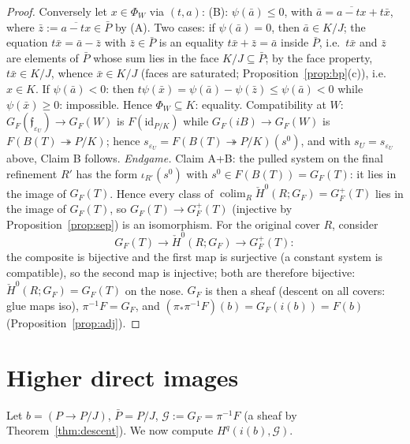 \documentclass[11pt]{article}
\theoremstyle{definition}
\newcommand{\colim}{\operatorname*{colim}}
\newcommand{\HH}{\check{H}}
\begin{document}
\begin{proof}
Conversely let $x\in\Phi_W$ via $(t,a)$: (B): $\psi(\bar a)\le0$,
with $\bar a=\overline{a-tx}+t\bar x$, where
$\bar z:=\overline{a-tx}\in\bar P$ by (A). Two cases: if
$\psi(\bar a)=0$, then $\bar a\in K/J$; the equation
$t\bar x=\bar a-\bar z$ with $\bar z\in\bar P$ is an equality
$t\bar x+\bar z=\bar a$ inside $\bar P$, i.e.\ $t\bar x$ and
$\bar z$ are elements of $\bar P$ whose sum lies in the face
$K/J\subseteq\bar P$; by the face property, $t\bar x\in K/J$,
whence $\bar x\in K/J$ (faces are saturated;
Proposition~\ref{prop:bp}(c)), i.e.\ $x\in K$. If
$\psi(\bar a)<0$: then
$t\psi(\bar x)=\psi(\bar a)-\psi(\bar z)\le\psi(\bar a)<0$ while
$\psi(\bar x)\ge0$: impossible. Hence
$\Phi_W\subseteq K$: equality.
Compatibility at $W$: $G_F(\mathfrak f_{\varepsilon_U})\to G_F(W)$
is $F(\mathrm{id}_{P/K})$ while $G_F(iB)\to G_F(W)$ is
$F(B(T)\twoheadrightarrow P/K)$; hence
$s_{\varepsilon_U}=F(B(T)\twoheadrightarrow P/K)(s^0)$, and with
$s_U=s_{\varepsilon_U}$ above, Claim B follows.
\emph{Endgame.} Claim A+B: the pulled system on the final refinement
$R'$ has the form $\iota_{R'}(s^0)$ with $s^0\in F(B(T))=G_F(T)$: it
lies in the image of $G_F(T)$. Hence every class of
$\colim_R\HH^0(R;G_F)=G_F^+(T)$ lies in the image of $G_F(T)$, so
$G_F(T)\to G_F^+(T)$ (injective by Proposition~\ref{prop:sep}) is an
isomorphism. For the original cover $R$, consider
\[
G_F(T)\longrightarrow\HH^0(R;G_F)\longrightarrow G_F^+(T):
\]
the composite is bijective and the first map is surjective (a
constant system is compatible), so the second map is injective; both
are therefore bijective: $\HH^0(R;G_F)=G_F(T)$ on the nose.
$G_F$ is then a sheaf (descent on all covers: glue maps iso),
$\pi^{-1}F=G_F$, and $(\pi_*\pi^{-1}F)(b)=G_F(i(b))=F(b)$
(Proposition~\ref{prop:adj}).
\end{proof}


\section{Higher direct images}\label{sec:direct}

Let $b=(P\to P/J)$, $\bar P=P/J$, $\mathcal G:=G_F=\pi^{-1}F$ (a
sheaf by Theorem~\ref{thm:descent}). We now compute
$H^q(i(b),\mathcal G)$.
\end{document}
